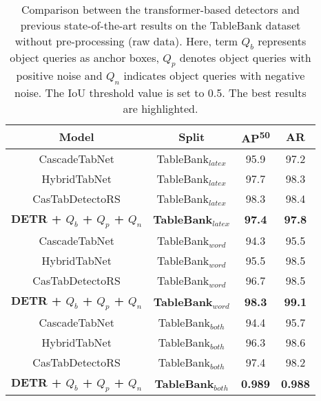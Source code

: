 \documentclass[sn-mathphys]{sn-jnl}\jyear{2021}\theoremstyle{thmstyleone}\newtheorem{theorem}{Theorem}\newtheorem{proposition}[theorem]{Proposition}\theoremstyle{thmstyletwo}\newtheorem{example}{Example}\newtheorem{remark}{Remark}\theoremstyle{thmstylethree}\newtheorem{definition}{Definition}\usepackage{amsmath}
\begin{document}
\begin{table*}
\tiny
\begin{center}
\caption{Comparison between the transformer-based detectors and previous state-of-the-art results on the TableBank dataset \colorbox{red!25}{without pre-processing} (raw data). Here, term $Q_b$ represents object queries as anchor boxes, $Q_p$ denotes object queries with positive noise and $Q_n$ indicates object queries with negative noise. The IoU threshold value is set to 0.5. The best results are highlighted.}\label{tab:TableBank2}\begin{tabular*}{\textwidth}{@{\extracolsep{\fill}}cccc@{\extracolsep{\fill}}}
\toprule
\textbf{Model} &
\textbf{Split} &
\textbf{AP\textsuperscript{50}} &
\textbf{AR} \\ 
\midrule
 CascadeTabNet \cite{Ayan29} &
 TableBank$_{latex}$ &
  95.9 &
  97.2 \\ \midrule
  HybridTabNet \cite{HybridTabNet}  &
  TableBank$_{latex}$&
  97.7 &
  98.3  \\ \midrule
  CasTabDetectoRS \cite{CasTab45}  &
  TableBank$_{latex}$ &
  98.3 &
  98.4  \\ \midrule
  \textbf{DETR + $Q_b$ + $Q_p$ + $Q_n$} &
  \textbf{TableBank$_{latex}$}&
  \textbf{97.4} &
  \textbf{97.8}  \\ \midrule
 CascadeTabNet \cite{Ayan29}  &
 TableBank$_{word}$&
  94.3  &
  95.5 \\ \midrule
  HybridTabNet \cite{HybridTabNet} &
  TableBank$_{word}$&
  95.5 &
  98.5   \\ \midrule
  CasTabDetectoRS \cite{CasTab45}  &
  TableBank$_{word}$ &
  96.7 &
  98.5  \\ \midrule
 \textbf{DETR + $Q_b$ + $Q_p$ + $Q_n$} &
 \textbf{TableBank$_{word}$}&
 \textbf{98.3} &
 \textbf{99.1}\\
 \midrule
 CascadeTabNet \cite{Ayan29} &
 TableBank$_{both}$ &
  94.4  &
  95.7 \\ \midrule
  HybridTabNet \cite{HybridTabNet}   &
 TableBank$_{both}$&
  96.3 &
  98.6  \\ \midrule
  CasTabDetectoRS \cite{CasTab45} &
   TableBank$_{both}$ &
   97.4&
  98.2   \\ \midrule
 \textbf{DETR + $Q_b$ + $Q_p$ + $Q_n$} &
 \textbf{TableBank$_{both}$}&
 \textbf{0.989} &
 \textbf{0.988}  \\ 
\bottomrule
\end{tabular*}
\end{center}
\end{table*} 
\end{document}
